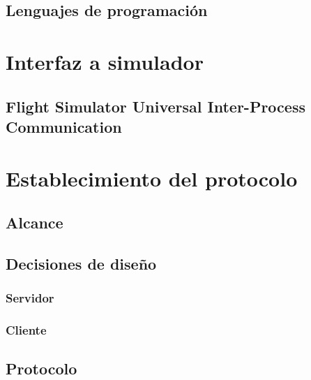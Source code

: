 \subsection{Lenguajes de programación}

\section{Interfaz a simulador}

\subsection{Flight Simulator Universal Inter-Process Communication}

\section{Establecimiento del protocolo}

\subsection{Alcance}

\subsection{Decisiones de diseño}

\subsubsection{Servidor}

\subsubsection{Cliente}

\subsection{Protocolo}



